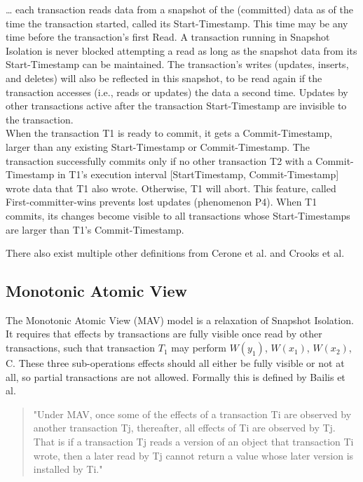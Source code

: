 \documentclass[a4paper,10pt,titlepage]{report}
\begin{document}
\begin{displayquote}
… each transaction reads data from a snapshot of the (committed) data as of the time the transaction started, called its Start-Timestamp. This time may be any time before the transaction's first Read. A transaction running in Snapshot Isolation is never blocked attempting a read as long as the snapshot data from its Start-Timestamp can be maintained. The transaction's writes (updates, inserts, and deletes) will also be reflected in this snapshot, to be read again if the transaction accesses (i.e., reads or updates) the data a second time. Updates by other transactions active after the transaction Start-Timestamp are invisible to the transaction.
\\
When the transaction T1 is ready to commit, it gets a Commit-Timestamp, larger than any existing Start-Timestamp or Commit-Timestamp. The transaction successfully commits only if no other transaction T2 with a Commit-Timestamp in T1's execution interval [StartTimestamp, Commit-Timestamp] wrote data that T1 also wrote. Otherwise, T1 will abort. This feature, called First-committer-wins prevents lost updates (phenomenon P4). When T1 commits, its changes become visible to all transactions whose Start-Timestamps are larger than T1's Commit-Timestamp.
\end{displayquote}

There also exist multiple other definitions from Cerone et al. \cite{CeroneBernardiGotsman} and Crooks et al. \cite{CrooksPuAlvisiClement}

\vspace{2mm}

\vspace{2mm}

\newpage
\subsection{Monotonic Atomic View}
The Monotonic Atomic View (MAV) model is a relaxation of Snapshot Isolation. It requires that effects by transactions are fully visible once read by other transactions, such that transaction $T_1$ may perform $W(y_1)$, $W(x_1)$, $W(x_2)$, C. These three sub-operations effects should all either be fully visible or not at all, so partial transactions are not allowed. Formally this is defined by Bailis et al. \cite{HighlyAvailableTransactionsVirtuesandLimitations}
\begin{quote}
    "Under MAV, once some of the effects of a transaction Ti are observed by another transaction Tj, thereafter, all effects of Ti are observed by Tj. That is if a transaction Tj reads a version of an object that transaction Ti wrote, then a later read by Tj cannot return a value whose later version is installed by Ti."
\end{quote}
\end{document}
